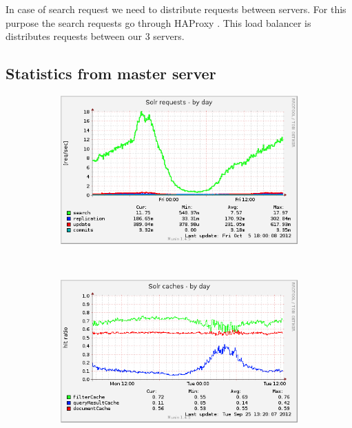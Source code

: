 \documentclass[10pt,a4paper]{article}
\begin{document}
In case of search request we need to distribute requests between servers. For this purpose the search requests go through HAProxy \cite{HAPROXY}. This load balancer is distributes requests between our 3 servers.

\subsection{Statistics from master server}

\begin{figure}
        \centering
        \begin{subfigure}[b]{0.45\textwidth}
                \centering
                \includegraphics[width=\textwidth]{solr_users_reqs-day}
                \label{fig:solr_users_reqs-day}
        \end{subfigure}%
        ~ %
        \begin{subfigure}[b]{0.45\textwidth}
                \centering
                \includegraphics[width=\textwidth]{solr_users_cache-day}
                \label{fig:solr_users_cache-day}
        \end{subfigure}
        

\end{figure}
\end{document}
